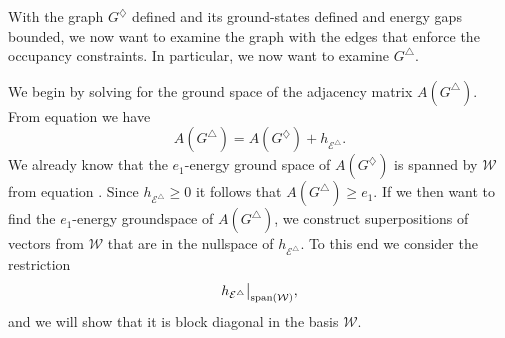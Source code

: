 \documentclass[../thesis-main/thesis-main]{subfiles}
\begin{document}
With the graph $G^{\diamondsuit}$ defined and its ground-states defined and energy gaps bounded, we now want to examine the graph with the edges that enforce the occupancy constraints.  In particular, we now want to examine $G^{\triangle}$.

We begin by solving for the ground space of the adjacency matrix $A(G^{\triangle})$. From equation  we have
\begin{equation}
  A(G^{\triangle})=A(G^{\diamondsuit})+h_{\mathcal{E}^{\triangle}}.\label{eq:A_g_diamond_triangle}
\end{equation}
We already know that the  $e_{1}$-energy ground space of $A(G^{\diamondsuit})$ is spanned by $\mathcal{W}$ from equation . Since $h_{\mathcal{E}^{\triangle}}\geq0$ it follows that $A(G^{\triangle})\geq e_{1}$.  If we then want to find the $e_{1}$-energy groundspace of $A(G^{\triangle})$, we construct superpositions of vectors from $\mathcal{W}$ that are in the nullspace of $h_{\mathcal{E}^{\triangle}}$. To this end we consider the restriction
\begin{equation}
  h_{\mathcal{E}^{\triangle}}\big|_{\operatorname{span}\left(\mathcal{W}\right)},\label{eq:restriction_h_triangle}
\end{equation}
and we will show that it is block diagonal in the basis $\mathcal{W}$.
\end{document}

